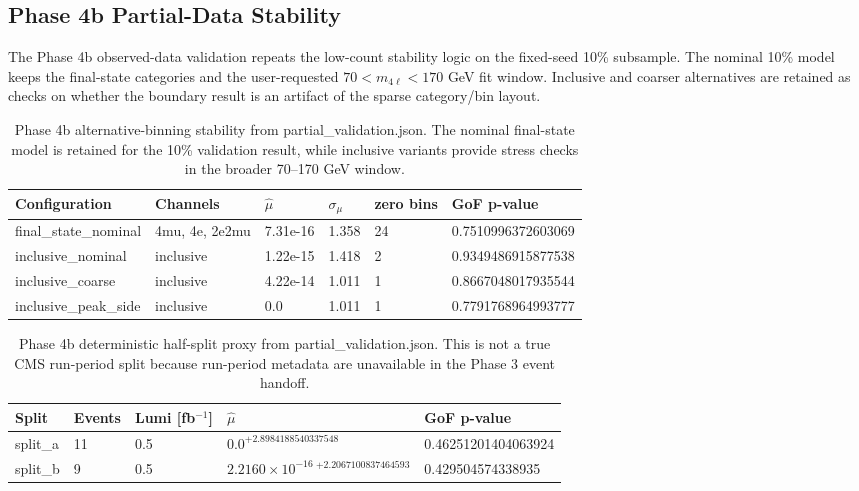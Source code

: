 \documentclass[11pt]{article}
\begin{document}
\subsection{Phase 4b Partial-Data Stability}
The Phase 4b observed-data validation repeats the low-count stability logic on the fixed-seed 10\% subsample. The nominal 10\% model keeps the final-state categories and the user-requested $70 < m_{4\ell} < 170$ GeV fit window. Inclusive and coarser alternatives are retained as checks on whether the boundary result is an artifact of the sparse category/bin layout.

\begin{table}[htbp]
\centering
\caption{Phase 4b alternative-binning stability from partial\_validation.json. The nominal final-state model is retained for the 10\% validation result, while inclusive variants provide stress checks in the broader 70--170 GeV window.}
\begin{tabular}{llllll}
\toprule
Configuration & Channels & $\hat{\mu}$ & $\sigma_\mu$ & zero bins & GoF p-value \\ 
\midrule
final\_state\_nominal & 4mu, 4e, 2e2mu & 7.31e-16 & 1.358 & 24 & 0.7510996372603069 \\
inclusive\_nominal & inclusive & 1.22e-15 & 1.418 & 2 & 0.9349486915877538 \\
inclusive\_coarse & inclusive & 4.22e-14 & 1.011 & 1 & 0.8667048017935544 \\
inclusive\_peak\_side & inclusive & 0.0 & 1.011 & 1 & 0.7791768964993777 \\
\bottomrule
\end{tabular}
\label{tab:partial-binning}
\end{table}

\begin{table}[htbp]
\centering
\caption{Phase 4b deterministic half-split proxy from partial\_validation.json. This is not a true CMS run-period split because run-period metadata are unavailable in the Phase 3 event handoff.}
\begin{small}
\begin{tabular}{lllll}
\toprule
Split & Events & Lumi [fb$^{-1}$] & $\hat{\mu}$ & GoF p-value \\ 
\midrule
split\_a & 11 & 0.5 & $0.0^{+2.8984188540337548}$ & 0.46251201404063924 \\
split\_b & 9 & 0.5 & $2.2160\times10^{-16}\,^{+2.2067100837464593}$ & 0.429504574338935 \\
\bottomrule
\end{tabular}
\end{small}
\label{tab:partial-split}
\end{table}
\end{document}
